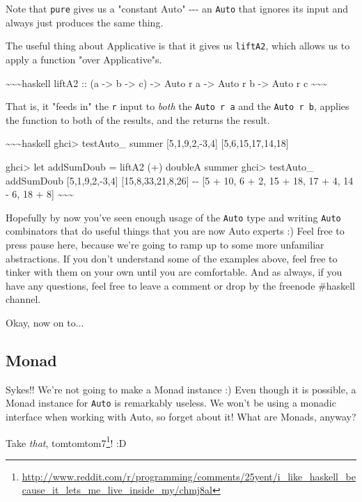 \documentclass[]{article}
\renewcommand{\href}[2]{#2\footnote{\url{#1}}}
\begin{document}
Note that \texttt{pure} gives us a "constant Auto" -\/-\/- an \texttt{Auto} that
ignores its input and always just produces the same thing.

The useful thing about Applicative is that it gives us \texttt{liftA2}, which
allows us to apply a function "over Applicative"s.

\textasciitilde{}\textasciitilde{}\textasciitilde{}haskell liftA2 :: (a
-\textgreater{} b -\textgreater{} c) -\textgreater{} Auto r a -\textgreater{}
Auto r b -\textgreater{} Auto r c
\textasciitilde{}\textasciitilde{}\textasciitilde{}

That is, it "feeds in" the \texttt{r} input to \emph{both} the
\texttt{Auto\ r\ a} and the \texttt{Auto\ r\ b}, applies the function to both of
the results, and the returns the result.

\textasciitilde{}\textasciitilde{}\textasciitilde{}haskell ghci\textgreater{}
testAuto\_ summer {[}5,1,9,2,-3,4{]} {[}5,6,15,17,14,18{]}

ghci\textgreater{} let addSumDoub = liftA2 (+) doubleA summer ghci\textgreater{}
testAuto\_ addSumDoub {[}5,1,9,2,-3,4{]} {[}15,8,33,21,8,26{]} -\/- {[}5 + 10, 6
+ 2, 15 + 18, 17 + 4, 14 - 6, 18 + 8{]}
\textasciitilde{}\textasciitilde{}\textasciitilde{}

Hopefully by now you've seen enough usage of the \texttt{Auto} type and writing
\texttt{Auto} combinators that do useful things that you are now Auto experts :)
Feel free to press pause here, because we're going to ramp up to some more
unfamiliar abstractions. If you don't understand some of the examples above,
feel free to tinker with them on your own until you are comfortable. And as
always, if you have any questions, feel free to leave a comment or drop by the
freenode \#haskell channel.

Okay, now on to...

\subsection{Monad}

Sykes!! We're not going to make a Monad instance :) Even though it is possible,
a Monad instance for \texttt{Auto} is remarkably useless. We won't be using a
monadic interface when working with Auto, so forget about it! What are Monads,
anyway?

Take \emph{that},
\href{http://www.reddit.com/r/programming/comments/25yent/i_like_haskell_because_it_lets_me_live_inside_my/chmj8al}{tomtomtom7}!
:D
\end{document}
